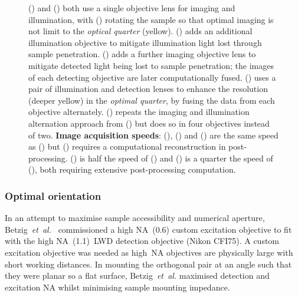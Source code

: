 \begin{figure}
\ContinuedFloat\caption[]{
        () and () both use a single objective lens for imaging and illumination, with () rotating the sample so that optimal imaging is not limit to the \emph{optical quarter} (yellow).
        () adds an additional illumination objective to mitigate illumination light lost through sample penetration.
        () adds a further imaging objective lens to mitigate detected light being lost to sample penetration; the images of each detecting objective are later computationally fused.
        () uses a pair of illumination and detection lenses to enhance the resolution (deeper yellow) in the \emph{optimal quarter}, by fusing the data from each objective alternately.
        () repeats the imaging and illumination alternation approach from () but does so in four objectives instead of two.
        \textbf{Image acquisition speeds}:
        (), () and () are the same speed as () but () requires a computational reconstruction in post-processing.
        () is half the speed of () and () is a quarter the speed of (), both requiring extensive post-processing computation.
      }\label{fig:spim_optimal_imaging}
\end{figure}

\subsubsection{Optimal orientation}

In an attempt to maximise sample accessibility and numerical aperture, Betzig~\emph{et~al.}~\cite{chenLatticeLightSheetMicroscopy2014} commissioned a high \gls{NA}~(\SI{0.6}{}) custom excitation objective to fit with the high \gls{NA}~(\SI{1.1}{})~\gls{LWD} detection objective (Nikon CFI75).
A custom excitation objective was needed as high~\gls{NA} objectives are physically large with short \gls{working distance}s.
In mounting the orthogonal pair at an angle such that they were planar so a flat surface, Betzig~\emph{et~al.} maximised detection and excitation \gls{NA} whilst minimising sample mounting impedance.

